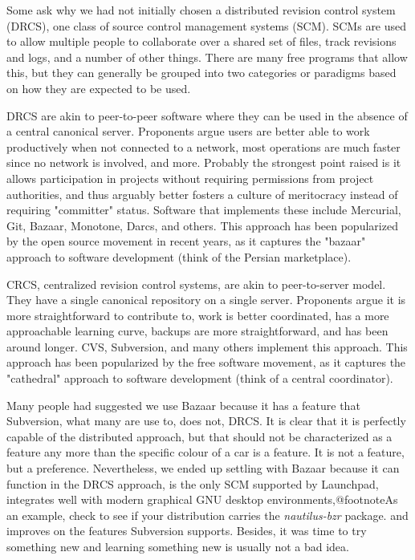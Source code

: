 Some ask why we had not initially chosen a distributed revision control system (DRCS), one class of source control management systems (SCM). SCMs are used to allow multiple people to collaborate over a shared set of files, track revisions and logs, and a number of other things. There are many free programs that allow this, but they can generally be grouped into two categories or paradigms based on how they are expected to be used.

DRCS are akin to peer-to-peer software where they can be used in the absence of a central canonical server. Proponents argue users are better able to work productively when not connected to a network, most operations are much faster since no network is involved, and more. Probably the strongest point raised is it allows participation in projects without requiring permissions from project authorities, and thus arguably better fosters a culture of meritocracy instead of requiring "committer" status. Software that implements these include Mercurial, Git, Bazaar, Monotone, Darcs, and others. This approach has been popularized by the open source movement in recent years, as it captures the "bazaar" approach to software development (think of the Persian marketplace).

CRCS, centralized revision control systems, are akin to peer-to-server model. They have a single canonical repository on a single server. Proponents argue it is more straightforward to contribute to, work is better coordinated, has a more approachable learning curve, backups are more straightforward, and has been around longer. CVS, Subversion, and many others implement this approach. This approach has been popularized by the free software movement, as it captures the "cathedral" approach to software development (think of a central coordinator).

Many people had suggested we use Bazaar because it has a feature that Subversion, what many are use to, does not, DRCS. It is clear that it is perfectly capable of the distributed approach, but that should not be characterized as a feature any more than the specific colour of a car is a feature. It is not a feature, but a preference. Nevertheless, we ended up settling with Bazaar because it can function in the DRCS approach, is the only SCM supported by Launchpad, integrates well with modern graphical GNU desktop environments,@footnote{As an example, check to see if your distribution carries the {\sl nautilus-bzr} package.} and improves on the features Subversion supports. Besides, it was time to try something new and learning something new is usually not a bad idea.

